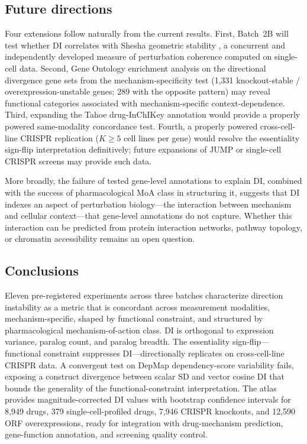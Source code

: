 \documentclass[11pt]{article}
\begin{document}
\subsection{Future directions}

Four extensions follow naturally from the current results.  First,
Batch~2B will test whether DI correlates with Shesha geometric
stability \citep{raju2026a, raju2026b}, a concurrent and independently
developed measure of perturbation coherence computed on single-cell
data.  Second, Gene Ontology enrichment analysis on the directional
divergence gene sets from the mechanism-specificity test (1{,}331 knockout-stable /
overexpression-unstable genes; 289 with the opposite pattern) may reveal
functional categories associated with mechanism-specific
context-dependence.  Third, expanding the Tahoe drug-InChIKey
annotation would provide a properly powered same-modality concordance
test.  Fourth, a properly powered
cross-cell-line CRISPR replication ($K \geq 5$ cell lines per gene)
would resolve the essentiality sign-flip interpretation definitively;
future expansions of JUMP or single-cell CRISPR screens
\citep{tahoe2025} may provide such data.

More broadly, the failure of tested gene-level annotations to
explain DI, combined with the success of pharmacological MoA class in
structuring it, suggests that DI indexes an aspect of perturbation
biology---the interaction between mechanism and cellular
context---that gene-level annotations do not capture.  Whether this
interaction can be predicted from protein interaction networks, pathway
topology, or chromatin accessibility remains an open question.

\subsection{Conclusions}

Eleven pre-registered experiments across three batches characterize
direction instability as a metric that is concordant across measurement
modalities, mechanism-specific, shaped by functional constraint, and
structured by pharmacological mechanism-of-action class.  DI is
orthogonal to expression variance, paralog count, and paralog
breadth.  The essentiality sign-flip---functional constraint suppresses
DI---directionally replicates on cross-cell-line CRISPR data.  A
convergent test on DepMap dependency-score variability fails, exposing a
construct divergence between scalar SD and vector cosine DI that
bounds the generality of the functional-constraint interpretation.  The
atlas provides magnitude-corrected DI values with bootstrap confidence
intervals for 8{,}949 drugs, 379 single-cell-profiled drugs, 7{,}946
CRISPR knockouts, and 12{,}590 ORF overexpressions, ready for
integration with drug-mechanism prediction, gene-function annotation,
and screening quality control.
\end{document}
